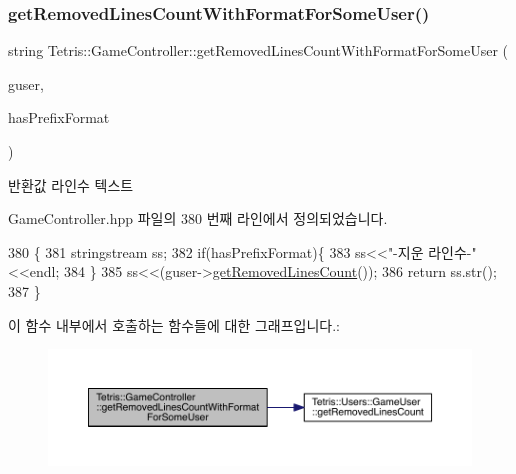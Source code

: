 \subsubsection{\texorpdfstring{get\+Removed\+Lines\+Count\+With\+Format\+For\+Some\+User()}{getRemovedLinesCountWithFormatForSomeUser()}}
{\footnotesize\ttfamily string Tetris\+::\+Game\+Controller\+::get\+Removed\+Lines\+Count\+With\+Format\+For\+Some\+User (\begin{DoxyParamCaption}\item[{\hyperlink{class_tetris_1_1_users_1_1_game_user}{Game\+User} $\ast$}]{guser,  }\item[{bool}]{has\+Prefix\+Format }\end{DoxyParamCaption})\hspace{0.3cm}{\ttfamily [inline]}}

\begin{DoxyReturn}{반환값}
라인수 텍스트 
\end{DoxyReturn}


Game\+Controller.\+hpp 파일의 380 번째 라인에서 정의되었습니다.


\begin{DoxyCode}
380                                                                                               \{
381             stringstream ss;
382             \textcolor{keywordflow}{if}(hasPrefixFormat)\{
383                 ss<<\textcolor{stringliteral}{"-지운 라인수-"}<<endl;
384             \}
385             ss<<(guser->\hyperlink{class_tetris_1_1_users_1_1_game_user_a5912def4d9d77adbb4323b35366724af}{getRemovedLinesCount}());
386             \textcolor{keywordflow}{return} ss.str();
387         \}
\end{DoxyCode}
이 함수 내부에서 호출하는 함수들에 대한 그래프입니다.\+:
\nopagebreak
\begin{figure}[H]
\begin{center}
\leavevmode
\includegraphics[width=350pt]{db/dd2/class_tetris_1_1_game_controller_a2e7275bdb8f29ce4f1dfec790c22705d_cgraph}
\end{center}
\end{figure}
\mbox{\label{class_tetris_1_1_game_controller_a84270bd9c52aae8ba1434d96a96b6c3c}} 
